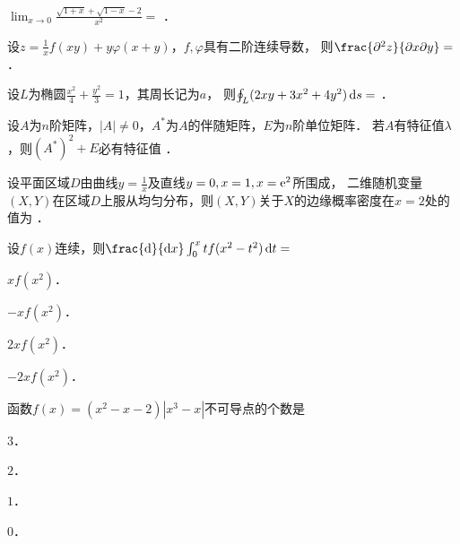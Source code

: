 \documentclass[plain,noanswer,medmath]{../../template/jnuexam}
\begin{document}




\begin{problem}
$\lim_{x \to 0} \frac{\sqrt{1 + x} + \sqrt{1 - x} - 2}{x^2} =$ \fillin{}．
\end{problem}


\begin{problem}
设$z = \frac{1}{x}f(xy) + y\varphi(x + y)$，$f,\varphi$具有二阶连续导数，
则$\frac{\pd^2 z}{\pdx\pdy}=$ \fillin{}．
\end{problem}


\begin{problem}
设$L$为椭圆$\frac{x^2}{4} + \frac{y^2}{3} = 1$，其周长记为$a$，
则$\oint_L (2xy + 3x^2 + 4y^2)\mathop{}\!\mathrm{d} s =$ \fillin{}．
\end{problem}


\begin{problem}
设$A$为$n$阶矩阵，$|A| \ne 0$，$A^*$为$A$的伴随矩阵，$E$为$n$阶单位矩阵．
若$A$有特征值$\lambda$，则$(A^*)^2 + E$必有特征值 \fillin{}．
\end{problem}


\begin{problem}
设平面区域$D$由曲线$y = \frac{1}{x}$及直线$y = 0,x = 1,x = \mathrm{e}^2$所围成，
二维随机变量$(X,Y)$在区域$D$上服从均匀分布，则$(X,Y)$关于$X$的边缘概率密度在$x=2$处的值为 \fillin{}．
\end{problem}




\begin{problem}
设$f(x)$连续，则$\frac{\d}{\dx}\int_0^x tf(x^2 - t^2) \dt =$\pickout{}
\begin{abcd}
\item $xf(x^2)$．
\item $- xf(x^2)$．
\item $2xf(x^2)$．
\item $- 2xf(x^2)$．
\end{abcd}
\end{problem}


\begin{problem}
函数$f(x) = (x^2 - x - 2)\left| x^3 - x \right|$不可导点的个数是\pickout{}
\begin{abcd}
\item $3$．
\item $2$．
\item $1$．
\item $0$．
\end{abcd}
\end{problem}
\end{document}
